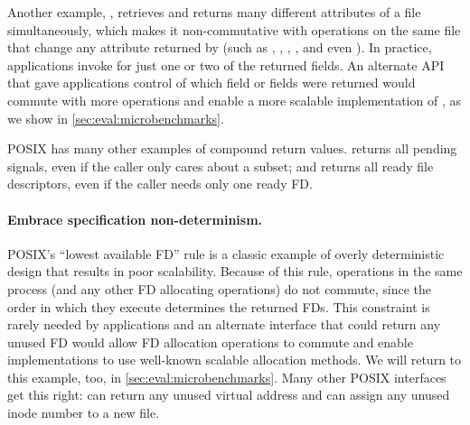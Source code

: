 Another example, , retrieves and returns many
different attributes of a file simultaneously, which makes it
non-commutative with operations on the same file that change any
attribute returned by  (such as , ,
, , and even ).  In practice,
applications invoke  for just one or two of the returned
fields. An alternate API that gave applications
control of which field or fields were returned
would commute with more operations and enable a more scalable
implementation of , as we show in
\cref{sec:eval:microbenchmarks}.

POSIX has many other examples of compound return values.
 returns all pending signals, even if the caller only
cares about a subset;
and  returns all ready file
descriptors, even if the caller needs only one ready FD.



\paragraph{Embrace specification non-determinism.}

POSIX's ``lowest available FD'' rule is a classic example of
overly deterministic design that results in poor scalability.
Because of this rule,  operations in the same process (and
any other FD allocating operations) do not commute, since the order in
which they execute determines the returned FDs.  This constraint is rarely
needed by applications and an alternate interface
that could return any
unused FD would allow FD allocation operations to commute and enable
implementations to use well-known scalable allocation methods.  We will
return to this example, too, in \cref{sec:eval:microbenchmarks}.
Many other POSIX interfaces get this right:  can
return any unused virtual address and  can assign any unused
inode number to a new file.


